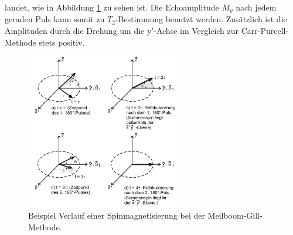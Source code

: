 landet, wie in Abbildung \ref{fig:mei-gil} zu sehen ist.
Die Echoamplitude $M_y$ nach jedem geraden Puls kann somit zu
$T_2$-Bestimmung benutzt werden.
Zusätzlich ist die Amplituden durch die Drehung
um die y'-Achse im Vergleich zur Carr-Purcell-Methode stets positiv.
\begin{figure}
  \centering
  \centering
  \includegraphics[width=0.6\textwidth]{mei-gil.PNG}
  \caption{Beispiel Verlauf einer Spinmagnetisierung bei
  der Meilboom-Gill-Methode.\cite{sample}}
  \label{fig:mei-gil}
\end{figure}
